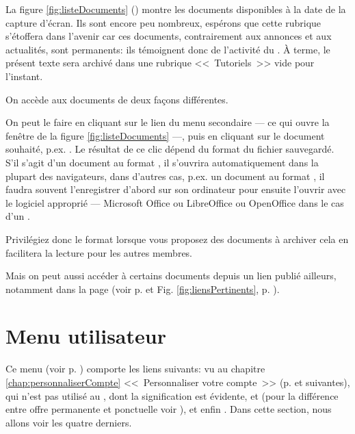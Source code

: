La figure \ref{fig:listeDocuments} () montre les documents disponibles à la date de la capture d'écran. Ils sont encore peu nombreux, espérons que cette rubrique s’étoffera dans l’avenir car ces documents, contrairement aux annonces et aux actualités, sont permanents: ils témoignent donc de l'activité du \sel. À terme, le présent texte sera archivé dans une rubrique <<~Tutoriels~>> vide pour l'instant.

On accède aux documents de deux  façons différentes.

On peut le faire  en cliquant sur le lien  du menu secondaire --- ce qui ouvre la fenêtre de la figure \ref{fig:listeDocuments} ---, puis en cliquant sur le document souhaité, p.ex. . Le résultat de ce clic dépend du format du fichier sauvegardé. S’il s’agit d’un document au format , il s’ouvrira automatiquement dans la plupart des navigateurs, dans d’autres cas, p.ex. un document au format , il faudra souvent l’enregistrer d'abord sur son ordinateur pour ensuite l’ouvrir avec le logiciel approprié --- Microsoft Office ou LibreOffice ou OpenOffice dans le cas d’un . 

Privilégiez donc le format  lorsque vous proposez des documents à archiver cela en facilitera la lecture pour les autres membres.

Mais on peut aussi accéder à certains documents depuis un lien publié ailleurs, notamment dans la page  (voir p. \pageref{page:lienIci} et Fig. \ref{fig:liensPertinents}, p. \pageref{fig:liensPertinents}).

\section{Menu utilisateur}
\label{sec:menuUtilisateur2}

Ce menu (voir p. \pageref{fig:menuUtilisateur}) comporte les liens suivants:    vu au chapitre \ref{chap:personnaliserCompte} <<~Personnaliser votre compte~>> (p. \pageref{chap:personnaliserCompte} et suivantes),  qui n'est pas utilisé au \CdS,  dont la signification est évidente,  et  (pour la différence entre offre permanente et ponctuelle voir ),  et enfin . Dans cette section, nous allons voir les quatre derniers.

